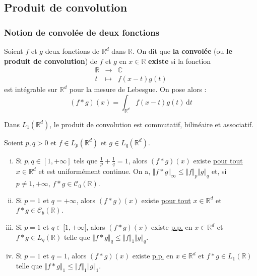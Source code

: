 	\subsection{Produit de convolution}

	\subsubsection{Notion de convolée de deux fonctions}


	\begin{definition}
		Soient $f$ et $g$ deux fonctions de $\mathbb{R}^d$ dans $\mathbb{R}$. On dit que \textbf{la convolée} (ou \textbf{le produit de convolution}) de $f$ et $g$ en $x \in \mathbb{R}$ \textbf{existe} si la fonction
		\[
		\begin{array}{ccc}
			\mathbb{R} &\rightarrow& \mathbb{C} \\
			t &\mapsto& f(x-t)g(t)
		\end{array}
		\]
		est intégrable sur $\mathbb{R}^d$ pour la mesure de Lebesgue. On pose alors :
		\[ (f * g)(x) = \int_{\mathbb{R}^d} f(x-t)g(t) \, \mathrm{d}t \]
	\end{definition}

	\begin{proposition}
		Dans $L_1(\mathbb{R}^d)$, le produit de convolution est commutatif, bilinéaire et associatif.
	\end{proposition}

	\begin{theorem}
		Soient $p, q > 0$ et $f \in L_p(\mathbb{R}^d)$ et $g \in L_q(\mathbb{R}^d)$.
		\begin{enumerate}[(i)]
			\item Si $p, q \in [1, +\infty]$ tels que $\frac{1}{p} + \frac{1}{q} = 1$, alors $(f * g)(x)$ existe \underline{pour tout} $x \in \mathbb{R}^d$ et est uniformément continue. On a, $\Vert f * g \Vert_\infty \leq \Vert f \Vert_p \Vert g \Vert_q$ et, si $p \neq 1, +\infty$, $f * g \in \mathcal{C}_0(\mathbb{R})$.
			\item Si $p = 1$ et $q = +\infty$, alors $(f * g)(x)$ existe \underline{pour tout} $x \in \mathbb{R}^d$ et $f * g \in \mathcal{C}_b(\mathbb{R})$.
			\item Si $p = 1$ et $q \in [1, +\infty[$, alors $(f * g)(x)$ existe \underline{p.p.} en $x \in \mathbb{R}^d$ et $f * g \in L_q(\mathbb{R})$ telle que $\Vert f * g \Vert_q \leq \Vert f \Vert_1 \Vert g \Vert_q$.
			\item Si $p = 1$ et $q = 1$, alors $(f * g)(x)$ existe \underline{p.p.} en $x \in \mathbb{R}^d$ et $f * g \in L_1(\mathbb{R})$ telle que $\Vert f * g \Vert_1 \leq \Vert f \Vert_1 \Vert g \Vert_1$.
		\end{enumerate}
	\end{theorem}

